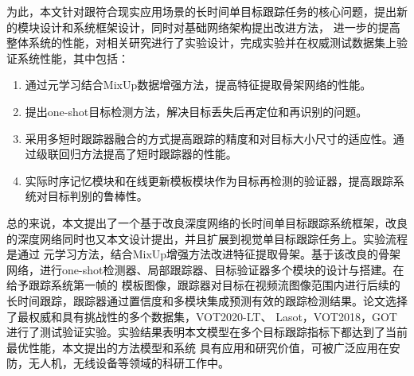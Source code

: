 \documentclass[promaster]{thesis-uestc}
\begin{document}
\begin{chineseabstract}
为此，本文针对跟符合现实应用场景的长时间单目标跟踪任务的核心问题，提出新的模块设计和系统框架设计，同时对基础网络架构提出改进方法，
进一步的提高整体系统的性能，对相关研究进行了实验设计，完成实验并在权威测试数据集上验证系统性能，其中包括：
\begin{enumerate}
    \item 通过元学习结合MixUp\cite{zhangmixup}数据增强方法，提高特征提取骨架网络的性能。
    \item 提出one-shot目标检测方法，解决目标丢失后再定位和再识别的问题。
    \item 采用多短时跟踪器融合的方式提高跟踪的精度和对目标大小尺寸的适应性。通过级联回归方法提高了短时跟踪器的性能。
    \item 实际时序记忆模块和在线更新模板模块作为目标再检测的验证器，提高跟踪系统对目标判别的鲁棒性。
\end{enumerate}

总的来说，本文提出了一个基于改良深度网络的长时间单目标跟踪系统框架，改良的深度网络同时也又本文设计提出，并且扩展到视觉单目标跟踪任务上。实验流程是通过
元学习方法，结合MixUp增强方法改进特征提取骨架。基于该改良的骨架网络，进行one-shot检测器、局部跟踪器、目标验证器多个模块的设计与搭建。在给予跟踪系统第一帧的
模板图像，跟踪器对目标在视频流图像范围内进行后续的长时间跟踪，跟踪器通过置信度和多模块集成预测有效的跟踪检测结果。论文选择了最权威和具有挑战性的多个数据集，VOT2020-LT\cite{}、
Lasot，VOT2018，GOT进行了测试验证实验。实验结果表明本文模型在多个目标跟踪指标下都达到了当前最优性能，本文提出的方法模型和系统
具有应用和研究价值，可被广泛应用在安防，无人机，无线设备等领域的科研工作中。

\end{chineseabstract}
\end{document}
